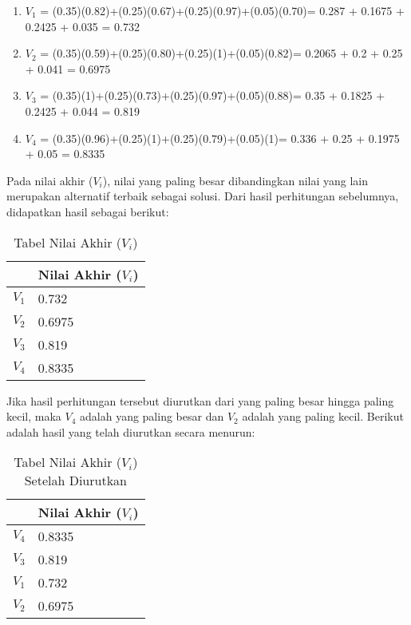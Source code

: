 \begin{enumerate}
	\item $V_{1}$ = (0.35)(0.82)+(0.25)(0.67)+(0.25)(0.97)+(0.05)(0.70)= 0.287 + 0.1675 + 0.2425 + 0.035 = 0.732
	\item $V_{2}$ = (0.35)(0.59)+(0.25)(0.80)+(0.25)(1)+(0.05)(0.82)= 0.2065 + 0.2 + 0.25 + 0.041 = 0.6975
	\item $V_{3}$ = (0.35)(1)+(0.25)(0.73)+(0.25)(0.97)+(0.05)(0.88)= 0.35 + 0.1825 + 0.2425 + 0.044 = 0.819
	\item $V_{4}$ = (0.35)(0.96)+(0.25)(1)+(0.25)(0.79)+(0.05)(1)= 0.336 + 0.25 + 0.1975 + 0.05 = 0.8335
\end{enumerate}

Pada nilai akhir ($V_{i}$), nilai yang paling besar dibandingkan nilai yang lain merupakan alternatif terbaik sebagai solusi. Dari hasil perhitungan sebelumnya, didapatkan hasil sebagai berikut:


\begin{table}[H]
	\centering
	\caption{Tabel Nilai Akhir ($V_{i}$)}
		\begin{tabular}{| l | l |} 
     \hline
     & Nilai Akhir ($V_{i}$)  \\ \hline
   $V_{1}$ & 0.732 \\ \hline
   $V_{2}$ & 0.6975   \\ \hline
	 $V_{3}$ & 0.819  \\ \hline
   $V_{4}$ & 0.8335   \\ 
    \hline
		
		\end{tabular}
	\label{table:nilaiakhir1}
\end{table}


Jika hasil perhitungan tersebut diurutkan dari yang paling besar hingga paling kecil, maka $V_{4}$ adalah yang paling besar dan $V_{2}$ adalah yang paling kecil. Berikut adalah hasil yang telah diurutkan secara menurun:

\begin{table}[H]
	\centering
	\caption{Tabel Nilai Akhir ($V_{i}$) Setelah Diurutkan}
		\begin{tabular}{| l | l |} 
     \hline
     & Nilai Akhir ($V_{i}$)  \\ \hline
   $V_{4}$ & 0.8335\\ \hline
	$V_{3}$ & 0.819\\ \hline
	$V_{1}$ & 0.732 \\ \hline
   $V_{2}$ & 0.6975  \\  
    \hline
		
		\end{tabular}
	\label{table:nilaiakhir2}
\end{table}

